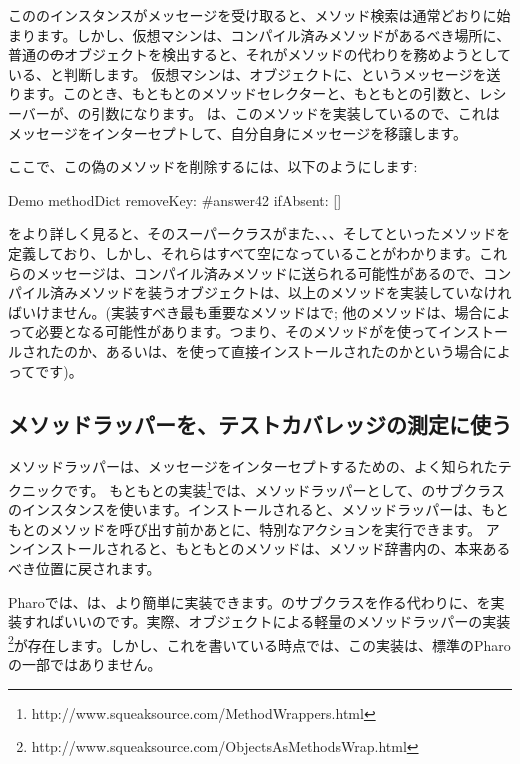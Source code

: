 \documentclass[a4paper,10pt,twoside]{book}
\begin{document}
こののインスタンスがメッセージを受け取ると、メソッド検索は通常どおりに始まります。しかし、仮想マシンは、コンパイル済みメソッドがあるべき場所に、普通の\st のオブジェクトを検出すると、それがメソッドの代わりを務めようとしている、と判断します。 %
仮想マシンは、オブジェクトに、というメッセージを送ります。このとき、もともとのメソッドセレクターと、もともとの引数と、レシーバーが、の引数になります。 %
は、このメソッドを実装しているので、これはメッセージをインターセプトして、自分自身にメッセージを移譲します。

ここで、この偽のメソッドを削除するには、以下のようにします:
\begin{code}{}
Demo methodDict removeKey: #answer42 ifAbsent: []
\end{code}

をより詳しく見ると、そのスーパークラスがまた、、、そしてといったメソッドを定義しており、しかし、それらはすべて空になっていることがわかります。これらのメッセージは、コンパイル済みメソッドに送られる可能性があるので、コンパイル済みメソッドを装うオブジェクトは、以上のメソッドを実装していなければいけません。(実装すべき最も重要なメソッドはで; 他のメソッドは、場合によって必要となる可能性があります。つまり、そのメソッドがを使ってインストールされたのか、あるいは、を使って直接インストールされたのかという場合によってです)。 %

\subsection{メソッドラッパーを、テストカバレッジの測定に使う}

メソッドラッパーは、メッセージをインターセプトするための、よく知られたテクニックです\cite{Bran98a}。
もともとの実装\footnote{http://www.squeaksource.com/MethodWrappers.html}では、メソッドラッパーとして、のサブクラスのインスタンスを使います。インストールされると、メソッドラッパーは、もともとのメソッドを呼び出す前かあとに、特別なアクションを実行できます。
アンインストールされると、もともとのメソッドは、メソッド辞書内の、本来あるべき位置に戻されます。

Pharoでは、は、より簡単に実装できます。のサブクラスを作る代わりに、を実装すればいいのです。実際、オブジェクトによる軽量のメソッドラッパーの実装\footnote{http://www.squeaksource.com/ObjectsAsMethodsWrap.html}が存在します。しかし、これを書いている時点では、この実装は、標準のPharoの一部ではありません。
\end{document}
